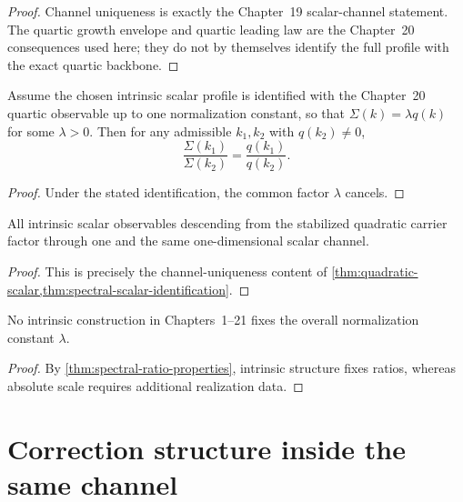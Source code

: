 \begin{proof}
Channel uniqueness is exactly the Chapter~19 scalar-channel statement.
The quartic growth envelope and quartic leading law are the Chapter~20
consequences used here; they do not by
themselves identify the full profile with the exact quartic backbone.
\end{proof}

\begin{corollary}
\label{cor:ratio-rigidity}
Assume the chosen intrinsic scalar profile is identified with the
Chapter~20 quartic observable up to one normalization constant, so that
\(\Sigma(k)=\lambda q(k)\) for some \(\lambda>0\).
Then for any admissible \(k_1,k_2\) with \(q(k_2)\neq0\),
\[
  \frac{\Sigma(k_1)}{\Sigma(k_2)}
  =
  \frac{q(k_1)}{q(k_2)}.
\]
\end{corollary}

\begin{proof}
Under the stated identification, the common factor \(\lambda\) cancels.
\end{proof}

\begin{theorem}
\label{thm:scalar-channel}
All intrinsic scalar observables descending from the stabilized quadratic
carrier factor through one and the same one-dimensional scalar channel.
\end{theorem}

\begin{proof}
This is precisely the channel-uniqueness content of
\cref{thm:quadratic-scalar,thm:spectral-scalar-identification}.
\end{proof}

\begin{theorem}
\label{thm:no-absolute}
No intrinsic construction in Chapters~1--21 fixes the overall
normalization constant \(\lambda\).
\end{theorem}

\begin{proof}
By \cref{thm:spectral-ratio-properties}, intrinsic structure fixes ratios,
whereas absolute scale requires additional realization data.
\end{proof}

\section{Correction structure inside the same channel}
\label{sec:shell-corrections}

